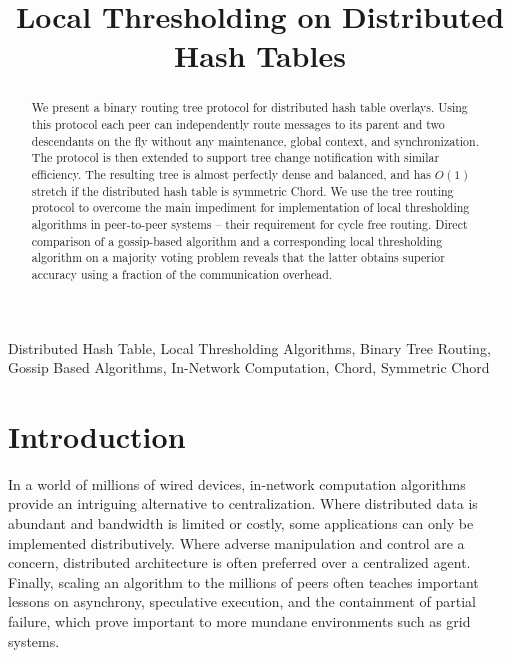 \documentclass[12pt,english,journal]{elsarticle}
\numberwithin{equation}{section}
\numberwithin{figure}{section}
\theoremstyle{plain}
\theoremstyle{plain}
\begin{document}
\title{Local Thresholding on Distributed Hash Tables}
\begin{abstract}
We present a binary routing tree protocol for distributed hash table
overlays. Using this protocol each peer can independently route messages
to its parent and two descendants on the fly without any maintenance,
global context, and synchronization. The protocol is then extended
to support tree change notification with similar efficiency. The resulting
tree is almost perfectly dense and balanced, and has $O\left(1\right)$
stretch if the distributed hash table is symmetric Chord. We use the
tree routing protocol to overcome the main impediment for implementation
of local thresholding algorithms in peer-to-peer systems -- their
requirement for cycle free routing. Direct comparison of a gossip-based
algorithm and a corresponding local thresholding algorithm on a majority
voting problem reveals that the latter obtains superior accuracy using
a fraction of the communication overhead.\end{abstract}
\begin{keyword}
Distributed Hash Table, Local Thresholding Algorithms, Binary Tree
Routing, Gossip Based Algorithms, In-Network Computation, Chord, Symmetric
Chord
\end{keyword}
\maketitle

\section{Introduction}

In a world of millions of wired devices, in-network computation algorithms
provide an intriguing alternative to centralization. Where distributed
data is abundant and bandwidth is limited or costly, some applications
can only be implemented distributively. Where adverse manipulation
and control are a concern, distributed architecture is often preferred
over a centralized agent. Finally, scaling an algorithm to the millions
of peers often teaches important lessons on asynchrony, speculative
execution, and the containment of partial failure, which prove important
to more mundane environments such as grid systems.
\end{document}
